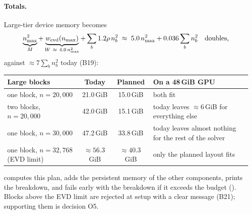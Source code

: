\documentclass[11pt]{article}
\begin{document}
\paragraph{Totals.} Large-tier device memory becomes
\[
\underbrace{n_{\max}^2}_{M} + \underbrace{w_{\rm evd}(n_{\max})}_{W\ \approx\ 4.0\,n_{\max}^2} +
\sum_b 1.2\rho\, n_b^2 \;\approx\; 5.0\,n_{\max}^2 + 0.036\sum_b n_b^2 \quad\text{doubles,}
\]
against $\approx 7\sum_b n_b^2$ today (B19):
\begin{center}\small
\begin{tabularx}{\textwidth}{@{}lcc>{\raggedright\arraybackslash}X@{}}
\toprule
Large blocks & Today & Planned & On a 48\,GiB GPU \\
\midrule
one block, $n = 20{,}000$ & 21.0\,GiB & 15.0\,GiB & both fit \\
two blocks, $n = 20{,}000$ & 42.0\,GiB & 15.1\,GiB & today leaves $\approx6$\,GiB for everything else \\
one block, $n = 30{,}000$ & 47.2\,GiB & 33.8\,GiB & today leaves almost nothing for the rest of the solver \\
one block, $n = 32{,}768$ (EVD limit) & $\approx56.3$\,GiB & $\approx40.3$\,GiB & only the planned layout fits \\
\bottomrule
\end{tabularx}
\end{center}
 computes this plan, adds the persistent memory of the other components, prints the
breakdown, and fails early with the breakdown if it exceeds the budget ().
Blocks above the EVD limit are rejected at setup with a clear message (B21); supporting them is decision O5.
\end{document}

